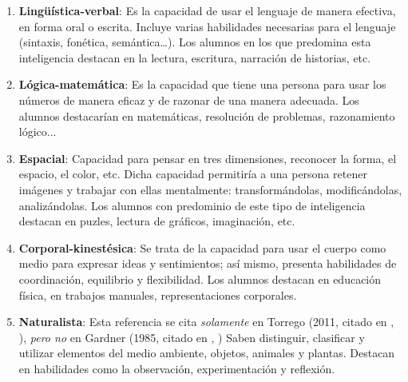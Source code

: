 \documentclass[12pt, a4paper]{article}
\begin{document}
	\begin{enumerate}
		\item \textbf{Lingüística-verbal}: Es la capacidad de usar el lenguaje de manera efectiva, en forma oral o escrita. Incluye varias habilidades necesarias para el lenguaje (sintaxis, fonética, semántica\dots). Los alumnos en los que predomina esta inteligencia destacan en la lectura, escritura, narración de historias, etc.
		
		
		\item \textbf{Lógica-matemática}: Es la capacidad que tiene una persona para usar los números de manera eficaz y de razonar de una manera adecuada. Los alumnos destacarían en matemáticas, resolución de problemas, razonamiento lógico...
		
		\item \textbf{Espacial}: Capacidad para pensar en tres dimensiones, reconocer la forma, el espacio, el color, etc. Dicha capacidad permitiría a una persona retener imágenes y trabajar con ellas mentalmente: transformándolas, modificándolas, analizándolas. Los alumnos con predominio de este tipo de inteligencia destacan en puzles, lectura de gráficos, imaginación, etc.
		
		\item \textbf{Corporal-kinestésica}: Se trata de la capacidad para usar el cuerpo como medio para expresar ideas y sentimientos; así mismo, presenta habilidades de coordinación, equilibrio y flexibilidad. Los alumnos destacan en educación física, en trabajos manuales, representaciones corporales.
		
		\item \textbf{Naturalista}: Esta referencia se cita \textit{solamente} en Torrego (2011, citado en \citeauthor{reche2019models}, \citeyear{reche2019models}), \textit{pero no} en Gardner (1985, citado en \citeauthor{Arocas2002OrientPsicopedGVA}, \citeyear{Arocas2002OrientPsicopedGVA}) Saben distinguir, clasificar y utilizar elementos del medio ambiente, objetos, animales y plantas. Destacan en habilidades como la observación, experimentación y reflexión.
		

\end{enumerate}
\end{document}
